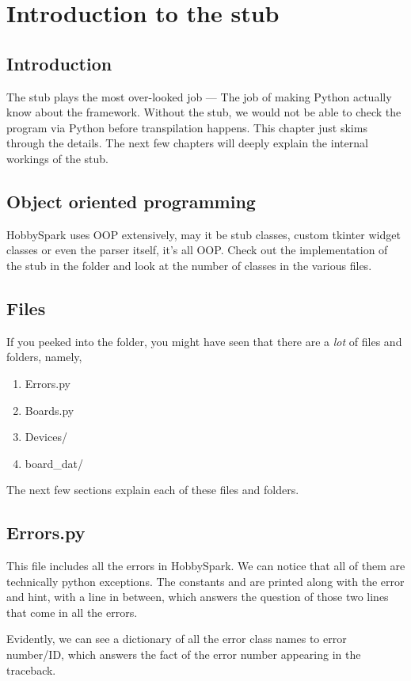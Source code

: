 \chapter{Introduction to the stub}
\label{chap:stub}
\section{Introduction}
The stub plays the most over-looked job --- The job of making Python actually know about the framework. Without the stub, we would not be able to check the program via Python before transpilation happens. This chapter just skims through the details. The next few chapters will deeply explain the internal workings of the stub.

\section{Object oriented programming}
HobbySpark uses OOP extensively, may it be stub classes, custom tkinter widget classes or even the parser itself, it's all OOP. Check out the implementation of the stub in the  folder and look at the number of classes in the various files.

\section{Files}
If you peeked into the  folder, you might have seen that there are a \emph{lot} of files and folders, namely,
\begin{enumerate}

    \item Errors.py
    \item Boards.py
    \item Devices/
    \item board\_dat/

\end{enumerate}

The next few sections explain each of these files and folders.

\section{Errors.py}
This file includes all the errors in HobbySpark. We can notice that all of them are technically python exceptions. The constants  and  are printed along with the error and hint, with a line in between, which answers the question of those two lines that come in all the errors. 

Evidently, we can see a dictionary of all the error class names to error number/ID, which answers the fact of the error number appearing in the traceback.

